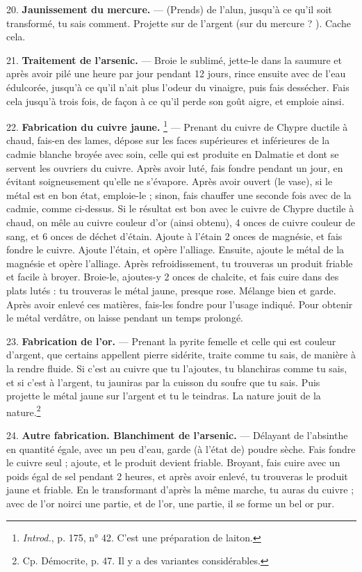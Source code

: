 \documentclass[a4paper, 11pt, oneside, polutonikogreek, french]{article}
\begin{document}
20. \textbf{Jaunissement du mercure.} --- (Prends) de l'alun, jusqu'à ce qu'il soit transformé, tu sais comment. Projette sur de l'argent (sur du mercure ? ). Cache cela.

21. \textbf{Traitement de l'arsenic.} --- Broie le sublimé, jette-le dans la saumure et après avoir pilé une heure par jour pendant 12 jours, rince ensuite avec de l'eau édulcorée, jusqu'à ce qu'il n'ait plus l'odeur du vinaigre, puis fais dessécher. Fais cela jusqu'à trois fois, de façon à ce qu'il perde son goût aigre, et emploie ainsi.

22. \textbf{Fabrication du cuivre jaune.} \footnote{\emph{Introd.}, p. 175, n° 42. C'est une préparation de laiton.} --- Prenant du cuivre de Chypre ductile à chaud, fais-en des lames, dépose sur les faces supérieures et inférieures de la cadmie blanche broyée avec soin, celle qui est produite en Dalmatie et dont se servent les ouvriers du cuivre. Après avoir luté, fais fondre pendant un jour, en évitant soigneusement qu'elle ne s'évapore. Après avoir ouvert (le vase), si le métal est en bon état, emploie-le ; sinon, fais chauffer une seconde fois avec de la cadmie, comme ci-dessus. Si le résultat est bon avec le cuivre de Chypre ductile à chaud, on mêle au cuivre couleur d'or (ainsi obtenu), 4 onces de cuivre couleur de sang, et 6 onces de déchet d'étain. Ajoute à l'étain 2 onces de magnésie, et fais fondre le cuivre. Ajoute l'étain, et opère l'alliage. Ensuite, ajoute le métal de la magnésie et opère l'alliage. Après refroidissement, tu trouveras un produit friable et facile à broyer. Broie-le, ajoutes-y 2 onces de chalcite, et fais cuire dans des plats lutés : tu trouveras le métal jaune, presque rose. Mélange bien et garde. Après avoir enlevé ces matières, fais-les fondre pour l'usage indiqué. Pour obtenir le métal verdâtre, on laisse pendant un temps prolongé.

23. \textbf{Fabrication de l'or.} --- Prenant la pyrite femelle et celle qui est couleur d'argent, que certains appellent pierre sidérite, traite comme tu sais, de manière à la rendre fluide. Si c'est au cuivre que tu l'ajoutes, tu blanchiras comme tu sais, et si c'est à l'argent, tu jauniras par la cuisson du soufre que tu sais. Puis projette le métal jaune sur l'argent et tu le teindras. La nature jouit de la nature.\footnote{Cp. Démocrite, p. 47. Il y a des variantes considérables.}

24. \textbf{Autre fabrication. Blanchiment de l'arsenic.} --- Délayant de l'absinthe en quantité égale, avec un peu d'eau, garde (à l'état de) poudre sèche. Fais fondre le cuivre seul ; ajoute, et le produit devient friable. Broyant, fais cuire avec un poids égal de sel pendant 2 heures, et après avoir enlevé, tu trouveras le produit jaune et friable. En le transformant d'après la même marche, tu auras du cuivre ; avec de l'or noirci une partie, et de l'or, une partie, il se forme un bel or pur.
\end{document}

